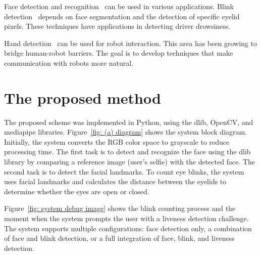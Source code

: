 \documentclass[english,hidelinks]{sbrt}
\begin{document}
Face detection and recognition~\cite{boyko2018performance} can be used in various applications.
Blink detection~\cite{mohanty2019design} depends on face segmentation and the detection of specific eyelid pixels.
These techniques have applications in detecting driver drowsiness.

Hand detection~\cite{qi2024computer} can be used for robot interaction.
This area has been growing to bridge human-robot barriers. The goal is to develop techniques that make communication with robots more natural.

\section{The proposed method}
\label{sec: III}

The proposed scheme was implemented in Python, using the dlib, OpenCV, and mediapipe libraries.
Figure~\ref{fig: (a) diagram} shows the system block diagram.
Initially, the system converts the RGB color space to grayscale to reduce processing time.
The first task is to detect and recognize the face using the dlib library by comparing a reference image (user's selfie) with the detected face.
The second task is to detect the facial landmarks.
To count eye blinks, the system uses facial landmarks and calculates the distance between the eyelids to determine whether the eyes are open or closed.

Figure~\ref{fig: system debug image} shows the blink counting process and the moment when the system prompts the user with a liveness detection challenge. The system supports multiple configurations: face detection only, a combination of face and blink detection, or a full integration of face, blink, and liveness detection.

\end{document}

